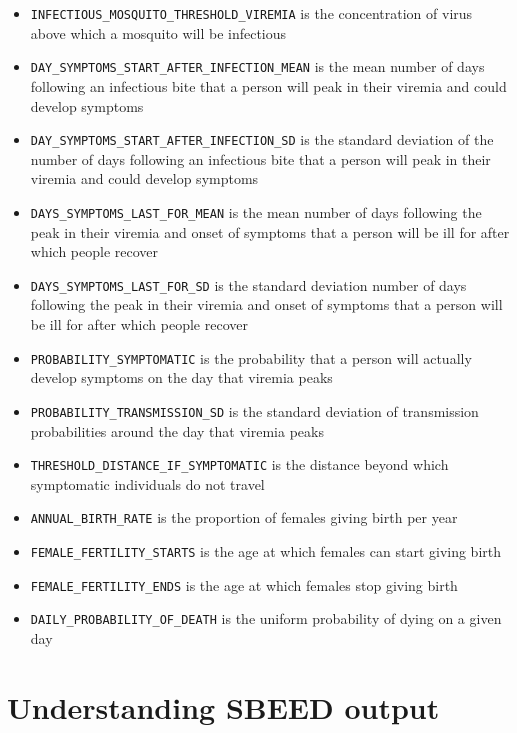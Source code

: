 \documentclass[11pt]{article}
\newcommand{\linecmd}[1]{\texttt{#1}}
\begin{document}
\begin{itemize}
	\item \linecmd{INFECTIOUS\_MOSQUITO\_THRESHOLD\_VIREMIA} is the concentration of virus above which a mosquito will be infectious
	\item \linecmd{DAY\_SYMPTOMS\_START\_AFTER\_INFECTION\_MEAN} is the mean number of days following an infectious bite that a person will peak in their viremia and could develop symptoms
	\item \linecmd{DAY\_SYMPTOMS\_START\_AFTER\_INFECTION\_SD} is the standard deviation of the number of days following an infectious bite that a person will peak in their viremia and could develop symptoms
	\item \linecmd{DAYS\_SYMPTOMS\_LAST\_FOR\_MEAN} is the mean number of days following the peak in their viremia and onset of symptoms that a person will be ill for after which people recover
	\item \linecmd{DAYS\_SYMPTOMS\_LAST\_FOR\_SD} is the standard deviation number of days following the peak in their viremia and onset of symptoms that a person will be ill for after which people recover
	\item \linecmd{PROBABILITY\_SYMPTOMATIC} is the probability that a person will actually develop symptoms on the day that viremia peaks
	\item \linecmd{PROBABILITY\_TRANSMISSION\_SD} is the standard deviation of transmission probabilities around the day that viremia peaks
	\item \linecmd{THRESHOLD\_DISTANCE\_IF\_SYMPTOMATIC} is the distance beyond which symptomatic individuals do not travel
	\item \linecmd{ANNUAL\_BIRTH\_RATE} is the proportion of females giving birth per year%
	\item \linecmd{FEMALE\_FERTILITY\_STARTS} is the age at which females can start giving birth
	\item \linecmd{FEMALE\_FERTILITY\_ENDS} is the age at which females stop giving birth
	\item \linecmd{DAILY\_PROBABILITY\_OF\_DEATH} is the uniform probability of dying on a given day%
	
\end{itemize}

\section{Understanding SBEED output}
\end{document}

